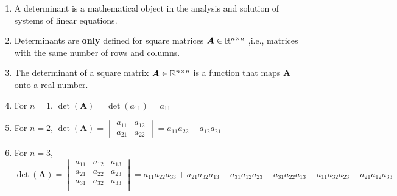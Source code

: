 \begin{enumerate}
    \item
    \begin{definition}[Determinant]
        A determinant is a mathematical object in the analysis and solution of systems of linear equations.
        \hfill \cite{mfml/book/mml/Deisenroth-Faisal-Ong}
    \end{definition}

    \item Determinants are \textbf{only} defined for square matrices $\bm{A} \in \mathbb{R}^{n\times n}$ ,i.e., matrices with the same number of rows and columns.
    \hfill \cite{mfml/book/mml/Deisenroth-Faisal-Ong}

    \item The determinant of a square matrix $\bm{A} \in \mathbb{R}^{n\times n}$ is a function that maps $\bm{A}$ onto a real number.
    \hfill \cite{mfml/book/mml/Deisenroth-Faisal-Ong}

    \item For $n=1$, $\det(\bm{A}) = \det(a_{11}) = a_{11}$
    \hfill \cite{mfml/book/mml/Deisenroth-Faisal-Ong}

    \item For $n=2$,
    $
        \det(\bm{A})
        = \begin{vmatrix}
            a_{11} & a_{12} \\
            a_{21} & a_{22}
        \end{vmatrix}
        = a_{11} a_{22} - a_{12} a_{21}
    $
    \hfill \cite{mfml/book/mml/Deisenroth-Faisal-Ong}

    \item
    \begin{definition}
        For $n=3$,
        \hfill \cite{mfml/book/mml/Deisenroth-Faisal-Ong}
        \\[0.3cm]
        $
            \det(\bm{A})
            = \begin{vmatrix}
                a_{11} & a_{12} & a_{13} \\
                a_{21} & a_{22} & a_{23} \\
                a_{31} & a_{32} & a_{33} \\
            \end{vmatrix}
            = a_{11} a_{22} a_{33}  + a_{21} a_{32} a_{13}  + a_{31} a_{12} a_{23}  - a_{31} a_{22} a_{13}  - a_{11} a_{32} a_{23}  - a_{21} a_{12} a_{33}
        $
        \hfill \cite{mfml/book/mml/Deisenroth-Faisal-Ong}
    \end{definition}


\end{enumerate}
